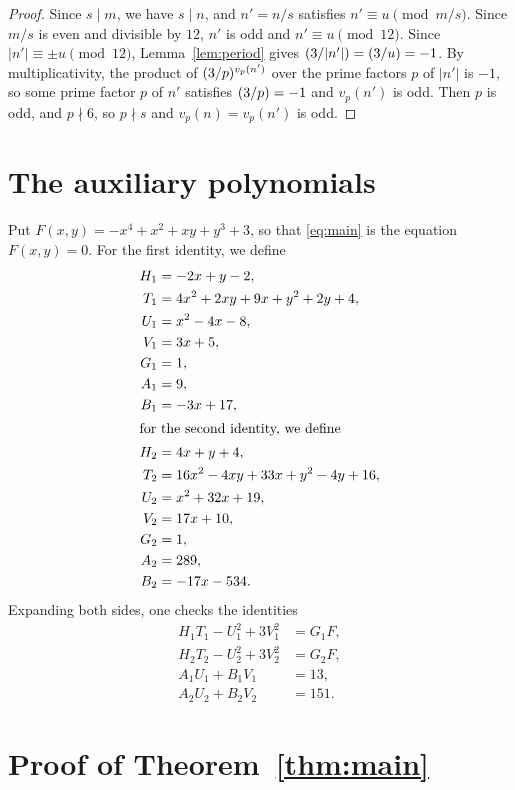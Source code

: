 \documentclass[11pt]{article}
\newcommand{\leg}[2]{\mathchoice{\biggl(\dfrac{#1}{#2}\biggr)}{(#1/#2)}{(#1/#2)}{(#1/#2)}}
\begin{document}
\begin{proof}
Since $s\mid m$, we have $s\mid n$, and $n'=n/s$ satisfies $n'\equiv u\pmod{m/s}$. Since $m/s$ is even and divisible by $12$, $n'$ is odd and $n'\equiv u\pmod{12}$. Since $|n'|\equiv\pm u\pmod{12}$, Lemma~\ref{lem:period} gives $\leg{3}{|n'|}=\leg{3}{u}=-1$. By multiplicativity, the product of $\leg{3}{p}^{v_p(n')}$ over the prime factors $p$ of $|n'|$ is $-1$, so some prime factor $p$ of $n'$ satisfies $\leg{3}{p}=-1$ and $v_p(n')$ is odd. Then $p$ is odd, and $p\nmid6$, so $p\nmid s$ and $v_p(n)=v_p(n')$ is odd.
\end{proof}

\section{The auxiliary polynomials}

Put $F(x,y)=-x^{4}+x^{2}+xy+y^{3}+3$, so that \eqref{eq:main} is the equation $F(x,y)=0$.
For the first identity, we define
\begin{align*}
H_{1}&=-2x+y-2,\\
T_{1}&=4x^{2}+2xy+9x+y^{2}+2y+4,\\
U_{1}&=x^{2}-4x-8,\\
V_{1}&=3x+5,\\
G_{1}&=1,\\
A_{1}&=9,\\
B_{1}&=-3x+17,\\
\intertext{for the second identity, we define}
H_{2}&=4x+y+4,\\
T_{2}&=16x^{2}-4xy+33x+y^{2}-4y+16,\\
U_{2}&=x^{2}+32x+19,\\
V_{2}&=17x+10,\\
G_{2}&=1,\\
A_{2}&=289,\\
B_{2}&=-17x-534.
\end{align*}
Expanding both sides, one checks the identities
\begin{align}
H_{1}T_{1}-U_{1}^2+3V_{1}^2&=G_{1}F,\label{eq:norm1}\\
H_{2}T_{2}-U_{2}^2+3V_{2}^2&=G_{2}F,\label{eq:norm2}\\
A_{1}U_{1}+B_{1}V_{1}&=13,\label{eq:bez1}\\
A_{2}U_{2}+B_{2}V_{2}&=151.\label{eq:bez2}
\end{align}

\section{Proof of Theorem~\ref{thm:main}}
\end{document}
